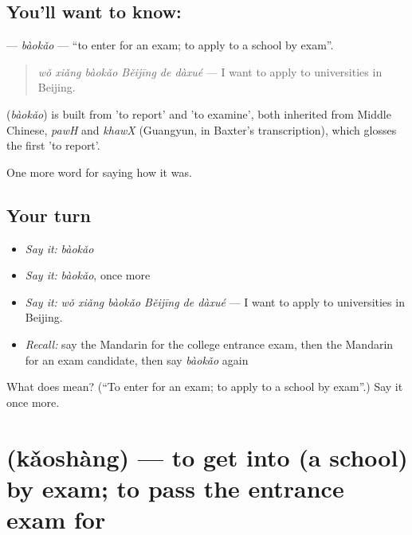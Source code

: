 \subsection*{You'll want to know: }
\textbf{} — \emph{bàokǎo} — \textquotedblleft{}to enter for an exam; to apply to a school by exam\textquotedblright{}.

\begin{quote}
\emph{wǒ xiǎng bàokǎo Běijīng de dàxué} — I want to apply to universities in Beijing.
\end{quote}

\begin{cousinweb}
\textbf{} (\emph{bàokǎo}) is built from  'to report' and  'to examine', both inherited from Middle Chinese, \emph{pawH} and \emph{khawX} (Guangyun, in Baxter's transcription), which glosses the first 'to report'.
\end{cousinweb}

\begin{grammarlens}[title={What you've built}]
One more word for saying how it was.
\end{grammarlens}

\subsection*{Your turn}
\begin{itemize}
\raggedright
  \item \emph{Say it:} \emph{bàokǎo}
  \item \emph{Say it:} \emph{bàokǎo}, once more
  \item \emph{Say it:} \emph{wǒ xiǎng bàokǎo Běijīng de dàxué} — I want to apply to universities in Beijing.
  \item \emph{Recall:} say the Mandarin for the college entrance exam, then the Mandarin for an exam candidate, then say \emph{bàokǎo} again
\end{itemize}

\begin{tcolorbox}[breakable,colback=teal!4,colframe=teal!35!black,title={Before you move on}]
What does  mean? (\textquotedblleft{}To enter for an exam; to apply to a school by exam\textquotedblright{}.) Say it once more.
\end{tcolorbox}
\section[\texorpdfstring{\zh{考上} (kǎoshàng)}{考上 (kǎoshàng)}]{ (kǎoshàng) — to get into (a school) by exam; to pass the entrance exam for}

